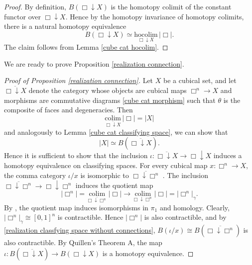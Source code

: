 \documentclass[oneside, 12pt]{amsart}
\numberwithin{equation}{section}
\theoremstyle{plain}
\theoremstyle{definition}
\theoremstyle{remark}
\begin{document}
	\begin{proof}
		By definition, $B(\Box\downarrow X)$ is the homotopy colimit of the constant functor over $\Box\downarrow X$. Hence by the homotopy invariance of homotopy colimits, there is a natural homotopy equivalence
		\[
		B(\Box\downarrow X)\simeq\underset{\Box\downarrow X}{\mathrm{hocolim}}\,|\Box|.
		\]
		The claim follows from Lemma \ref{cube cat hocolim}.
	\end{proof}
	
	
	
	We are ready to prove Proposition \ref{realization connection}.
	
	
	
	\begin{proof}
		[Proof of Proposition \ref{realization connection}]
		Let $X$ be a cubical set, and let $\overline{\Box\downarrow X}$ denote the category whose objects are cubical maps $\Box^n\to X$ and morphisms are commutative diagrams \eqref{cube cat morphism} such that $\theta$ is the composite of faces and degeneracies. Then
		\[
		\underset{\overline{\Box\downarrow X}}{\mathrm{colim}}\,|\Box|=|X|
		\]
		and analogously to Lemma \ref{cube cat classifying space}, we can show that
		\begin{equation}
			\label{realization classfying space without connections}
			|X|\simeq B(\overline{\Box\downarrow X}).
		\end{equation}
		Hence it is sufficient to show that the inclusion $\iota\colon\overline{\Box\downarrow X}\to\Box\downarrow X$ induces a homotopy equivalence on classifying spaces. For every cubical map $x\colon\Box^n\to X$, the comma category $\iota/x$ is isomorphic to $\overline{\Box\downarrow\Box^n}$ . The inclusion $\overline{\Box\downarrow\Box^n}\to\Box\downarrow\Box^n$ induces the quotient map
		\[
		|\Box^n|=\underset{\overline{\Box\downarrow \Box^n}}{\mathrm{colim}}\,|\Box|\to\underset{\Box\downarrow\Box^n}{\mathrm{colim}}\,|\Box|=|\Box^n|_\gamma.
		\]
		By \cite[Propositions 2.1 and 2.2]{A}, the quotient map induces isomorphisms in $\pi_1$ and homology. Clearly, $|\Box^n|_\gamma\cong[0,1]^n$ is contractible. Hence $|\Box^n|$ is also contractible, and by \eqref{realization classfying space without connections}, $B(\iota/x)\cong B(\overline{\Box\downarrow\Box^n})$ is also contractible. By Quillen's Theorem A, the map $\iota\colon B(\overline{\Box\downarrow X})\to B(\Box\downarrow X)$ is a homotopy equivalence.
	\end{proof}
	
	
	
\end{document}
